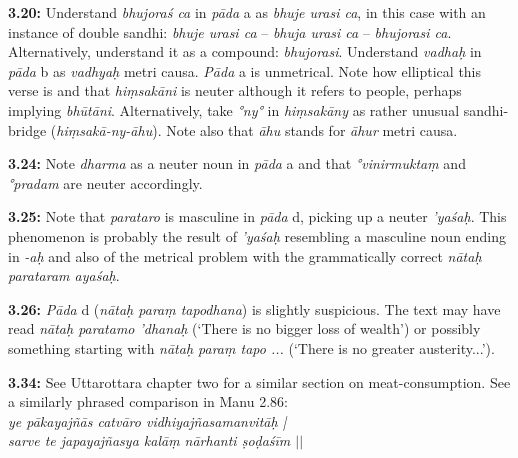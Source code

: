 \documentclass{article}
\newcommand{\vsnum}[1]{\textbf{#1}}
\newcommand{\skt}[1]{\textit{#1}}
\begin{document}
\vsnum{3.20: }Understand \skt{bhujoraś ca} in \skt{pāda} a as \skt{bhuje urasi ca}, in this case with an instance of double sandhi: \skt{bhuje urasi ca} -- \skt{bhuja urasi ca} -- \skt{bhujorasi ca}. Alternatively, understand it as a compound: \skt{bhujorasi}. Understand \skt{vadhaḥ} in \skt{pāda} b as \skt{vadhyaḥ} metri causa. \skt{Pāda} a is unmetrical. Note how elliptical this verse is and that \skt{hiṃsakāni} is neuter although it refers to people, perhaps implying \skt{bhūtāni}. Alternatively, take \skt{°ny°} in \skt{hiṃsakāny} as rather unusual sandhi-bridge (\skt{hiṃsakā-ny-āhu}). Note also that \skt{āhu} stands for \skt{āhur} metri causa.

\vsnum{3.24: }Note \skt{dharma} as a neuter noun in \skt{pāda} a and that \skt{°vinirmuktaṃ} and \skt{°pradam} are neuter accordingly.

\vsnum{3.25: }Note that \skt{parataro} is masculine in \skt{pāda} d, picking up a neuter \skt{'yaśaḥ}. This phenomenon is probably the result of \skt{'yaśaḥ} resembling a masculine noun ending in \skt{-aḥ} and also of the metrical problem with the grammatically correct \skt{nātaḥ parataram ayaśaḥ}.

\vsnum{3.26: }\skt{Pāda} d (\skt{nātaḥ paraṃ tapodhana}) is slightly suspicious. The text may have read \skt{nātaḥ paratamo 'dhanaḥ} (`There is no bigger loss of wealth') or possibly something starting with \skt{nātaḥ paraṃ tapo ...} (`There is no greater austerity...').

\vsnum{3.34: }See Uttarottara chapter two for a similar section on meat-consumption. See a similarly phrased comparison in Manu 2.86: \\ \skt{ye pākayajñās catvāro vidhiyajñasamanvitāḥ |\\ sarve te japayajñasya kalāṃ nārhanti ṣoḍaśīm $||$}
\end{document}
